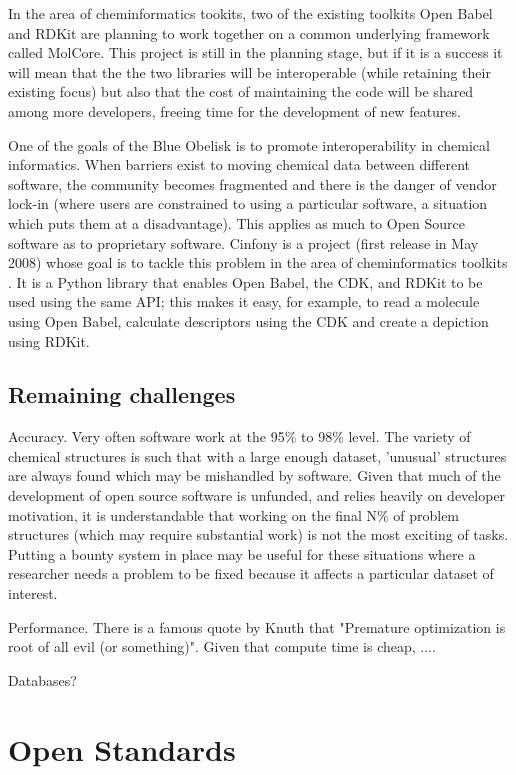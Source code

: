 \documentclass[10pt]{bmc_article}
\newenvironment{bmcformat}{\begin{raggedright}\baselineskip20pt\sloppy\setboolean{publ}{false}}{\end{raggedright}\baselineskip20pt\sloppy}
\begin{document}
\begin{bmcformat}
In the area of cheminformatics tookits, two of the existing toolkits Open Babel and RDKit are planning to work together on a common underlying framework called MolCore. This project is still in the planning stage, but if it is a success it will mean that the the two libraries will be interoperable (while retaining their existing focus) but also that the cost of maintaining the code will be shared among more developers, freeing time for the development of new features.

One of the goals of the Blue Obelisk is to promote interoperability in chemical
informatics. When barriers exist to moving chemical data between
different software, the community becomes fragmented and there is
the danger of vendor lock-in (where users are constrained to using
a particular software, a situation which puts them at a
disadvantage). This applies as much to Open Source software as to
proprietary software. Cinfony is a project (first release in May 2008)
whose goal is to tackle this problem in the area of cheminformatics
toolkits \cite{OBoyleCinfony2008}.
It is a Python library that enables Open Babel, the CDK, and RDKit to
be used using the same API; this makes it easy, for example, to read a
molecule using Open Babel, calculate descriptors using the CDK and
create a depiction using RDKit.

  \subsection*{Remaining challenges}

Accuracy. Very often software work at the 95\% to 98\% level. The variety of chemical structures is such that with a large enough dataset, 'unusual' structures are always found which may be mishandled by software. Given that much of the development of open source software is unfunded, and relies heavily on developer motivation, it is understandable that working on the final N\% of problem structures (which may require substantial work) is not the most exciting of tasks. Putting a bounty system in place may be useful for these situations where a researcher needs a problem to be fixed because it affects a particular dataset of interest.

Performance. There is a famous quote by Knuth that "Premature optimization is root of all evil (or something)". Given that compute time is cheap, ....

Databases?

\section*{Open Standards}

\end{bmcformat}
\end{document}
